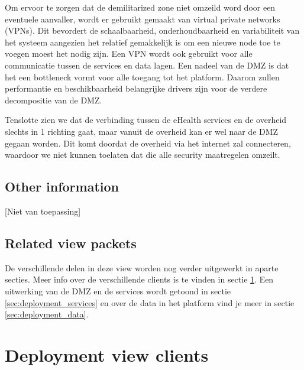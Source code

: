 \documentclass[a4paper,10pt]{article}
\begin{document}
Om ervoor te zorgen dat de demilitarized zone niet omzeild word door een eventuele aanvaller, wordt er gebruikt gemaakt van virtual private networks (VPNs). Dit bevordert de schaalbaarheid, onderhoudbaarheid en variabiliteit van het systeem aangezien het relatief gemakkelijk is om een nieuwe node toe te voegen moest het nodig zijn. Een VPN wordt ook gebruikt voor alle communicatie tussen de services en data lagen. Een nadeel van de DMZ is dat het een bottleneck vormt voor alle toegang tot het platform. Daarom zullen performantie en beschikbaarheid belangrijke drivers zijn voor de verdere decompositie van de DMZ.

Tenslotte zien we dat de verbinding tussen de eHealth services en de overheid slechts in 1 richting gaat, maar vanuit de overheid kan er wel naar de DMZ gegaan worden. Dit komt doordat de overheid via het internet zal connecteren, waardoor we niet kunnen toelaten dat die alle security maatregelen omzeilt.

\subsection{Other information}
[Niet van toepassing]

\subsection{Related view packets}

De verschillende delen in deze view worden nog verder uitgewerkt in aparte secties. Meer info over de verschillende clients is te vinden in sectie \ref{sec:deployment_clients}. Een uitwerking van de DMZ en de services wordt getoond in sectie \ref{sec:deployment_services} en over de data in het platform vind je meer in sectie \ref{sec:deployment_data}.

\section{Deployment view clients}
\label{sec:deployment_clients}
\end{document}
